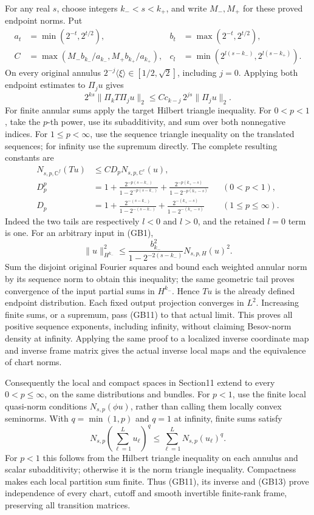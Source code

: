 \documentclass[
  11pt,
]{article}
\begin{document}
For any real \(s\), choose integers \(k_-<s<k_+\), and write \(M_-,M_+\)
for these proved endpoint norms. Put \[
 \begin{aligned}
 a_t&=\min(2^{-t},2^{t/2}),&
 b_t&=\max(2^{-t},2^{t/2}),\\
 C&=\max(M_-b_{k_-}/a_{k_-},
                  M_+b_{k_+}/a_{k_+}),&
 c_l&=\min(2^{l(s-k_-)},2^{l(s-k_+)}).
 \end{aligned}
 \tag{GB9}
\] On every original annulus \(2^{-j}\langle\xi\rangle\in[1/2,\sqrt2]\),
including \(j=0\). Applying both endpoint estimates to \(\Pi_j u\) gives
\[
 2^{ks}\|\Pi_kT\Pi_j u\|_2
       \le Cc_{k-j}\,2^{js}\|\Pi_j u\|_2.
 \tag{GB10}
\] For finite annular sums apply the target Hilbert triangle inequality.
For \(0<p<1\), take the \(p\)-th power, use its subadditivity, and sum
over both nonnegative indices. For \(1\le p<\infty\), use the sequence
triangle inequality on the translated sequences; for infinity use the
supremum directly. The complete resulting constants are \[
 \begin{aligned}
 N_{s,p,\mathbb C^f}(Tu)&\le CD_pN_{s,p,\mathbb C^e}(u),\\
 D_p^p&=1+\frac{2^{-p(s-k_-)}}{1-2^{-p(s-k_-)}}
             +\frac{2^{-p(k_+-s)}}{1-2^{-p(k_+-s)}}
                         &&(0<p<1),\\
 D_p&=1+\frac{2^{-(s-k_-)}}{1-2^{-(s-k_-)}}
             +\frac{2^{-(k_+-s)}}{1-2^{-(k_+-s)}}
                         &&(1\le p\le\infty).
 \end{aligned}
 \tag{GB11}
\] Indeed the two tails are respectively \(l<0\) and \(l>0\), and the
retained \(l=0\) term is one. For an arbitrary input in (GB1), \[
 \|u\|_{H^{k_-}}^2\le
       \frac{b_{k_-}^2}{1-2^{-2(s-k_-)}}
          N_{s,p,H}(u)^2.
 \tag{GB12}
\] Sum the disjoint original Fourier squares and bound each weighted
annular norm by its sequence norm to obtain this inequality; the same
geometric tail proves convergence of the input partial sums in
\(H^{k_-}\). Hence \(Tu\) is the already defined endpoint distribution.
Each fixed output projection converges in \(L^2\). Increasing finite
sums, or a supremum, pass (GB11) to that actual limit. This proves all
positive sequence exponents, including infinity, without claiming
Besov-norm density at infinity. Applying the same proof to a localized
inverse coordinate map and inverse frame matrix gives the actual inverse
local maps and the equivalence of chart norms.

Consequently the local and compact spaces in Section11 extend to every
\(0<p\le\infty\), on the same distributions and bundles. For \(p<1\),
use the finite local quasi-norm conditions \(N_{s,p}(\phi u)\), rather
than calling them locally convex seminorms. With \(q=\min(1,p)\) and
\(q=1\) at infinity, finite sums satisfy \[
 N_{s,p}\left(\sum_{\ell=1}^L u_\ell\right)^q
       \le\sum_{\ell=1}^L N_{s,p}(u_\ell)^q.
 \tag{GB13}
\] For \(p<1\) this follows from the Hilbert triangle inequality on each
annulus and scalar subadditivity; otherwise it is the norm triangle
inequality. Compactness makes each local partition sum finite. Thus
(GB11), its inverse and (GB13) prove independence of every chart, cutoff
and smooth invertible finite-rank frame, preserving all transition
matrices.
\end{document}
